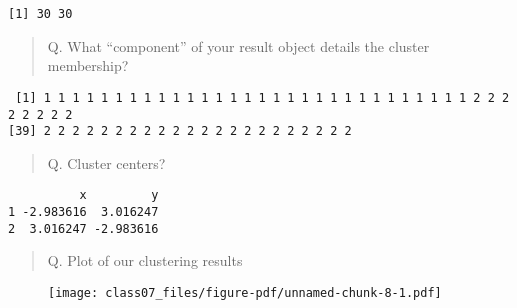 \documentclass[
  letterpaper,
  DIV=11,
  numbers=noendperiod]{scrartcl}
\newenvironment{Shaded}{\begin{snugshade}}{\end{snugshade}}
\newcommand{\AttributeTok}[1]{\textcolor[rgb]{0.40,0.45,0.13}{#1}}
\newcommand{\DecValTok}[1]{\textcolor[rgb]{0.68,0.00,0.00}{#1}}
\newcommand{\FunctionTok}[1]{\textcolor[rgb]{0.28,0.35,0.67}{#1}}
\newcommand{\NormalTok}[1]{\textcolor[rgb]{0.00,0.23,0.31}{#1}}
\newcommand{\SpecialCharTok}[1]{\textcolor[rgb]{0.37,0.37,0.37}{#1}}
\newcommand{\StringTok}[1]{\textcolor[rgb]{0.13,0.47,0.30}{#1}}
\begin{document}
\begin{verbatim}
[1] 30 30
\end{verbatim}

\begin{quote}
Q. What ``component'' of your result object details the cluster
membership?
\end{quote}

\begin{Shaded}
\end{Shaded}

\begin{verbatim}
 [1] 1 1 1 1 1 1 1 1 1 1 1 1 1 1 1 1 1 1 1 1 1 1 1 1 1 1 1 1 1 1 2 2 2 2 2 2 2 2
[39] 2 2 2 2 2 2 2 2 2 2 2 2 2 2 2 2 2 2 2 2 2 2
\end{verbatim}

\begin{quote}
Q. Cluster centers?
\end{quote}

\begin{Shaded}
\end{Shaded}

\begin{verbatim}
          x         y
1 -2.983616  3.016247
2  3.016247 -2.983616
\end{verbatim}

\begin{quote}
Q. Plot of our clustering results
\end{quote}

\begin{Shaded}
\end{Shaded}

\begin{figure}[H]

{\centering \texttt{[image: class07\_files/figure-pdf/unnamed-chunk-8-1.pdf]}

}

\end{figure}
\end{document}
